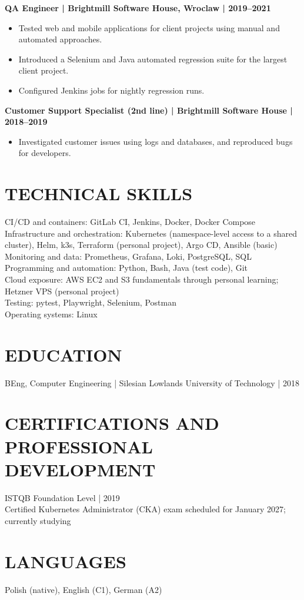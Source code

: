 \documentclass[11pt,a4paper]{article}
\begin{document}
\textbf{QA Engineer | Brightmill Software House, Wroclaw | 2019–2021}
\begin{itemize}
\item Tested web and mobile applications for client projects using manual and automated approaches.
\item Introduced a Selenium and Java automated regression suite for the largest client project.
\item Configured Jenkins jobs for nightly regression runs.
\end{itemize}

\textbf{Customer Support Specialist (2nd line) | Brightmill Software House | 2018–2019}
\begin{itemize}
\item Investigated customer issues using logs and databases, and reproduced bugs for developers.
\end{itemize}

\section*{TECHNICAL SKILLS}
CI/CD and containers: GitLab CI, Jenkins, Docker, Docker Compose\\
Infrastructure and orchestration: Kubernetes (namespace-level access to a shared cluster), Helm, k3s, Terraform (personal project), Argo CD, Ansible (basic)\\
Monitoring and data: Prometheus, Grafana, Loki, PostgreSQL, SQL\\
Programming and automation: Python, Bash, Java (test code), Git\\
Cloud exposure: AWS EC2 and S3 fundamentals through personal learning; Hetzner VPS (personal project)\\
Testing: pytest, Playwright, Selenium, Postman\\
Operating systems: Linux

\section*{EDUCATION}
BEng, Computer Engineering | Silesian Lowlands University of Technology | 2018

\section*{CERTIFICATIONS AND PROFESSIONAL DEVELOPMENT}
ISTQB Foundation Level | 2019\\
Certified Kubernetes Administrator (CKA) exam scheduled for January 2027; currently studying

\section*{LANGUAGES}
Polish (native), English (C1), German (A2)
\end{document}
